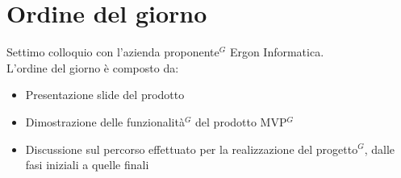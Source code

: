 \section*{Ordine del giorno}
Settimo colloquio con l'azienda proponente$^G$ Ergon Informatica.\\
L'ordine del giorno è composto da:
\begin{itemize}
	\item Presentazione slide del prodotto
	\item Dimostrazione delle funzionalità$^G$ del prodotto MVP$^G$
	\item Discussione sul percorso effettuato per la realizzazione del progetto$^G$, dalle fasi iniziali a quelle finali
\end{itemize}